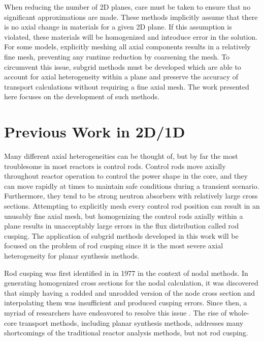 When reducing the number of 2D planes, care must be taken to ensure that no significant approximations are made.  These methods implicitly assume that there is no axial change in materials for a given 2D plane.  If this assumption is violated, these materials will be homogenized and introduce error in the solution.  For some models, explicitly meshing all axial components results in a relatively fine mesh, preventing any runtime reduction by coarsening the mesh.  To circumvent this issue, subgrid methods must be developed which are able to account for axial heterogeneity within a plane and preserve the accuracy of transport calculations without requiring a fine axial mesh.  The work presented here focuses on the development of such methods.

\section{Previous Work in 2D/1D}

Many different axial heterogeneities can be thought of, but by far the most troublesome in most reactors is control rods.  Control rods move axially throughout reactor operation to control the power shape in the core, and they can move rapidly at times to maintain safe conditions during a transient scenario.  Furthermore, they tend to be strong neutron absorbers with relatively large cross sections.  Attempting to explicitly mesh every control rod position can result in an unusably fine axial mesh, but homogenizing the control rods axially within a plane results in unacceptably large errors in the flux distribution called rod cusping.  The application of subgrid methods developed in this work will be focused on the problem of rod cusping since it is the most severe axial heterogeneity for planar synthesis methods.

Rod cusping was first identified in \cite{finnemann1977RodCuspingOrigMention} in 1977 in the context of nodal methods.  In generating homogenized cross sections for the nodal calculation, it was discovered that simply having a rodded and unrodded version of the node cross section and interpolating them was insufficient and produced cusping errors.  Since then, a myriad of researchers have endeavored to resolve this issue \cite{HanSemJooThesis1984,hoxieThesis1982application,khalilThesis1983application,chengThesis1981homogenizationResponseMatrix,finckThesis1982homogenizationResponseMatrix,bennewitz1975higher,finnemann1981space,langenbuch1977coarse,HanSemJooThesis1984,gehinThesis1992quasi,smith1992enhancementsStudxvickCoreManagementSystem,lee1998CuspingCorrection1DFineMeshFluxProfiles,downar2004PARCStheory,kim1990BilinearWeighting,de2012NEMmodification,martinez1999NEMmodOrig,dall2002nodeEquivalenceDecusping,yamamoto2004pinByPinNodalDecusping,yu2015CIAMArodDecusping,lu2015CIAMAintro,cho2015CRX2d1dFusionDecusping,ICAPPcontrolRodDecuspingNTRACER,Ryu2017nTRACERWholeCoreTransportSolutionstoC5G7-TDBenchmark}.  The rise of whole-core transport methods, including planar synthesis methods, addresses many shortcomings of the traditional reactor analysis methods, but not rod cusping.


